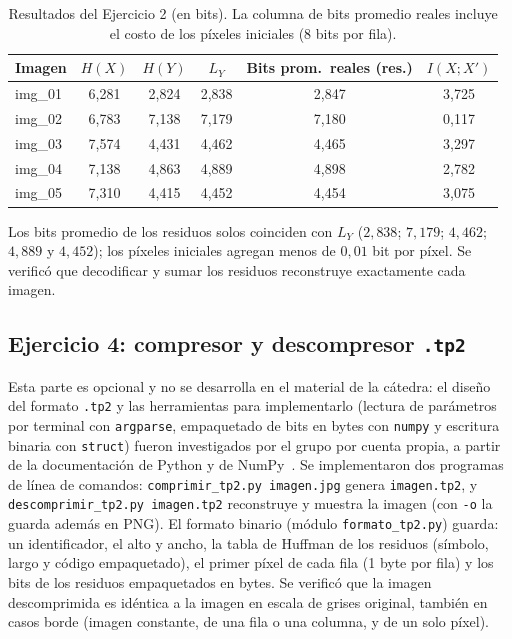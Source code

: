 \documentclass[11pt,a4paper]{article}
\begin{document}
\begin{table}[H]
\centering
\begin{tabular}{lccccc}
\toprule
Imagen & $H(X)$ & $H(Y)$ & $L_Y$ & Bits prom.\ reales (res.) & $I(X;X')$ \\
\midrule
img\_01 & 6,281 & 2,824 & 2,838 & 2,847 & 3,725 \\
img\_02 & 6,783 & 7,138 & 7,179 & 7,180 & 0,117 \\
img\_03 & 7,574 & 4,431 & 4,462 & 4,465 & 3,297 \\
img\_04 & 7,138 & 4,863 & 4,889 & 4,898 & 2,782 \\
img\_05 & 7,310 & 4,415 & 4,452 & 4,454 & 3,075 \\
\bottomrule
\end{tabular}
\caption{Resultados del Ejercicio 2 (en bits). La columna de bits promedio reales incluye el costo de los píxeles iniciales (8 bits por fila).}
\end{table}

Los bits promedio de los residuos solos coinciden con $L_Y$ ($2{,}838$; $7{,}179$; $4{,}462$; $4{,}889$ y $4{,}452$); los píxeles iniciales agregan menos de $0{,}01$ bit por píxel. Se verificó que decodificar y sumar los residuos reconstruye exactamente cada imagen.

\subsection{Ejercicio 4: compresor y descompresor \texttt{.tp2}}
Esta parte es opcional y no se desarrolla en el material de la cátedra: el diseño del formato \texttt{.tp2} y las herramientas para implementarlo (lectura de parámetros por terminal con \texttt{argparse}, empaquetado de bits en bytes con \texttt{numpy} y escritura binaria con \texttt{struct}) fueron investigados por el grupo por cuenta propia, a partir de la documentación de Python y de NumPy~\cite{pydocs}. Se implementaron dos programas de línea de comandos: \texttt{comprimir\_tp2.py imagen.jpg} genera \texttt{imagen.tp2}, y \texttt{descomprimir\_tp2.py imagen.tp2} reconstruye y muestra la imagen (con \texttt{-o} la guarda además en PNG). El formato binario (módulo \texttt{formato\_tp2.py}) guarda: un identificador, el alto y ancho, la tabla de Huffman de los residuos (símbolo, largo y código empaquetado), el primer píxel de cada fila (1 byte por fila) y los bits de los residuos empaquetados en bytes. Se verificó que la imagen descomprimida es idéntica a la imagen en escala de grises original, también en casos borde (imagen constante, de una fila o una columna, y de un solo píxel).
\end{document}
